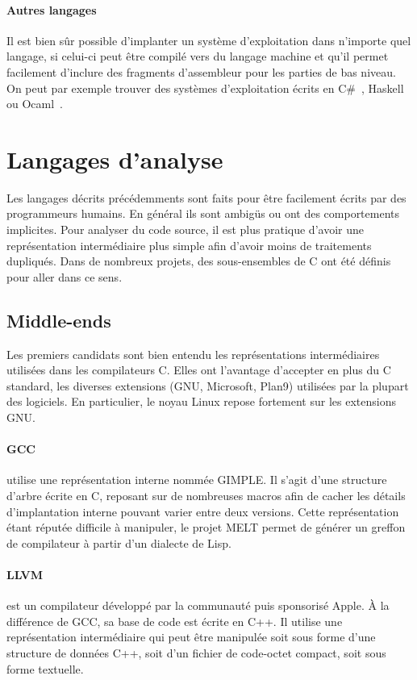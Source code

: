 \paragraph{Autres langages}

Il est bien sûr possible d'implanter un système d'exploitation dans n'importe
quel langage, si celui-ci peut être compilé vers du langage machine et qu'il
permet facilement d'inclure des fragments d'assembleur pour les parties de bas
niveau. On peut par exemple trouver des systèmes d'exploitation écrits en
C\#~\cite{SingularityOverview}, Haskell~\cite{HaskellOS} ou
Ocaml~\cite{unikernels}.

\section{Langages d'analyse}

Les langages décrits précédemments sont faits pour être facilement écrits par
des programmeurs humains. En général ils sont ambigüs ou ont des comportements
implicites. Pour analyser du code source, il est plus pratique d'avoir une
représentation intermédiaire plus simple afin d'avoir moins de traitements
dupliqués. Dans de nombreux projets, des sous-ensembles de C ont été définis
pour aller dans ce sens.

\subsection*{Middle-ends}

Les premiers candidats sont bien entendu les représentations intermédiaires
utilisées dans les compilateurs C. Elles ont l'avantage d'accepter en plus du C
standard, les diverses extensions (GNU, Microsoft, Plan9) utilisées par la
plupart des logiciels. En particulier, le noyau Linux repose fortement sur les
extensions GNU.\@

\paragraph{GCC} utilise une représentation interne nommée
GIMPLE\cite{gcc-gimple}. Il s'agit d'une structure d'arbre écrite en C, reposant
sur de nombreuses macros afin de cacher les détails d'implantation interne
pouvant varier entre deux versions. Cette représentation étant réputée difficile
à manipuler, le projet MELT\cite{gcc-melt} permet de générer un greffon de
compilateur à partir d'un dialecte de Lisp.

\paragraph{LLVM}\cite{llvm-pres} est un compilateur développé par la communauté
puis sponsorisé Apple. À la différence de GCC, sa base de code est écrite en
C++. Il utilise une représentation intermédiaire qui peut être manipulée soit
sous forme d'une structure de données C++, soit d'un fichier de code-octet
compact, soit sous forme textuelle.

